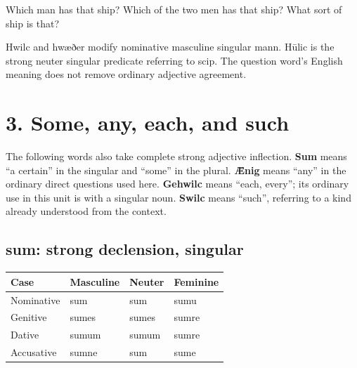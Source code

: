 Which man has that ship? Which of the two men has that ship? What sort of ship is that?

Hwilc and hwæðer modify nominative masculine singular mann. Hūlic is the strong neuter singular predicate referring to scip. The question word’s English meaning does not remove ordinary adjective agreement.

\section*{3. Some, any, each, and such}

The following words also take complete strong adjective inflection. \textbf{Sum} means “a certain” in the singular and “some” in the plural. \textbf{Ǣnig} means “any” in the ordinary direct questions used here. \textbf{Gehwilc} means “each, every”; its ordinary use in this unit is with a singular noun. \textbf{Swilc} means “such”, referring to a kind already understood from the context.

\subsection*{sum: strong declension, singular}

\par\begingroup
\fontsize{10.5}{13.2}\selectfont
\setlength{\LTleft}{0pt}\setlength{\LTright}{\fill}
\noindent
\begin{tabular}{@{}>{\raggedright\arraybackslash}p{28.89mm}>{\raggedright\arraybackslash}p{28.89mm}>{\raggedright\arraybackslash}p{28.89mm}>{\raggedright\arraybackslash}p{28.89mm}@{}}
\toprule
\textbf{Case} & \textbf{Masculine} & \textbf{Neuter} & \textbf{Feminine} \\
\midrule
Nominative & sum & sum & sumu \\
Genitive & sumes & sumes & sumre \\
Dative & sumum & sumum & sumre \\
Accusative & sumne & sum & sume \\
\bottomrule
\end{tabular}
\par\endgroup

